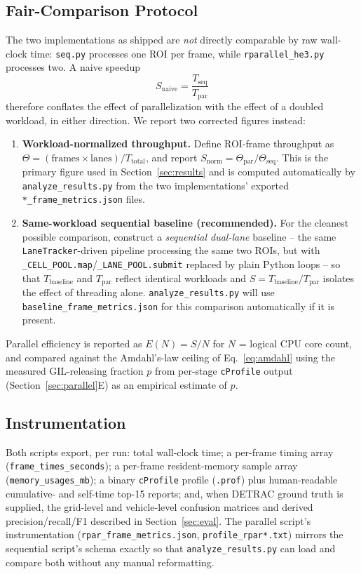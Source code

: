 \documentclass[conference]{IEEEtran}
\newcommand{\code}[1]{\texttt{#1}}
\begin{document}
\subsection{Fair-Comparison Protocol}
\label{sec:fair}
The two implementations as shipped are \emph{not} directly comparable
by raw wall-clock time: \code{seq.py} processes one ROI per frame,
while \code{rparallel\_he3.py} processes two. A naive speedup
\begin{equation}
S_{\text{naive}} = \frac{T_{\text{seq}}}{T_{\text{par}}}
\end{equation}
therefore conflates the effect of parallelization with the effect of a
doubled workload, in either direction. We report two corrected figures
instead:
\begin{enumerate}
\item \textbf{Workload-normalized throughput.} Define ROI-frame
throughput as $\Theta = (\text{frames}\times\text{lanes}) /
T_{\text{total}}$, and report $S_{\text{norm}} = \Theta_{\text{par}} /
\Theta_{\text{seq}}$. This is the primary figure used in
Section~\ref{sec:results} and is computed automatically by
\code{analyze\_results.py} from the two implementations' exported
\code{*\_frame\_metrics.json} files.
\item \textbf{Same-workload sequential baseline (recommended).} For the
cleanest possible comparison, construct a \emph{sequential dual-lane}
baseline -- the same \code{LaneTracker}-driven pipeline processing the
same two ROIs, but with \code{\_CELL\_POOL.map}/\code{\_LANE\_POOL.submit}
replaced by plain Python loops -- so that $T_{\text{baseline}}$ and
$T_{\text{par}}$ reflect identical workloads and $S =
T_{\text{baseline}}/T_{\text{par}}$ isolates the effect of threading
alone. \code{analyze\_results.py} will use
\code{baseline\_frame\_metrics.json} for this comparison automatically
if it is present.
\end{enumerate}
Parallel efficiency is reported as $E(N) = S/N$ for $N$ = logical CPU
core count, and compared against the Amdahl's-law ceiling of
Eq.~\eqref{eq:amdahl} using the measured GIL-releasing fraction $p$ from
per-stage \code{cProfile} output (Section~\ref{sec:parallel}E) as an
empirical estimate of $p$.

\subsection{Instrumentation}
Both scripts export, per run: total wall-clock time; a per-frame
timing array (\code{frame\_times\_seconds}); a per-frame resident-memory
sample array (\code{memory\_usages\_mb}); a binary \code{cProfile}
profile (\code{.prof}) plus human-readable cumulative- and
self-time top-15 reports; and, when DETRAC ground truth is supplied,
the grid-level and vehicle-level confusion matrices and derived
precision/recall/F1 described in Section~\ref{sec:eval}. The parallel
script's instrumentation (\code{rpar\_frame\_metrics.json},
\code{profile\_rpar*.txt}) mirrors the sequential script's schema
exactly so that \code{analyze\_results.py} can load and compare both
without any manual reformatting.
\end{document}
